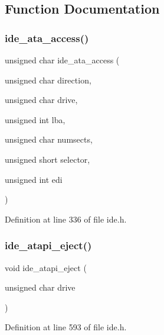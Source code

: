 \subsection{Function Documentation}
\mbox{\label{a00005_a4da0883393a98b937fdc3015a0a3f265_a4da0883393a98b937fdc3015a0a3f265}} 
\subsubsection{\texorpdfstring{ide\+\_\+ata\+\_\+access()}{ide\_ata\_access()}}
{\footnotesize\ttfamily unsigned char ide\+\_\+ata\+\_\+access (\begin{DoxyParamCaption}\item[{unsigned char}]{direction,  }\item[{unsigned char}]{drive,  }\item[{unsigned int}]{lba,  }\item[{unsigned char}]{numsects,  }\item[{unsigned short}]{selector,  }\item[{unsigned int}]{edi }\end{DoxyParamCaption})}



Definition at line 336 of file ide.\+h.

\mbox{\label{a00005_a92d054539c112a72e080e35a3341b0b9_a92d054539c112a72e080e35a3341b0b9}} 
\subsubsection{\texorpdfstring{ide\+\_\+atapi\+\_\+eject()}{ide\_atapi\_eject()}}
{\footnotesize\ttfamily void ide\+\_\+atapi\+\_\+eject (\begin{DoxyParamCaption}\item[{unsigned char}]{drive }\end{DoxyParamCaption})}



Definition at line 593 of file ide.\+h.

\mbox{\label{a00005_a1652da42785708fa6ea21ce4aef8c628_a1652da42785708fa6ea21ce4aef8c628}} 

